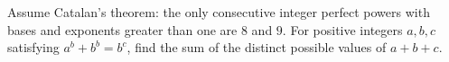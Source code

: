 Assume Catalan's theorem: the only consecutive integer perfect powers with bases and exponents greater than one are $8$ and $9$. For positive integers $a,b,c$ satisfying $a^b+b^b=b^c$, find the sum of the distinct possible values of $a+b+c$.

